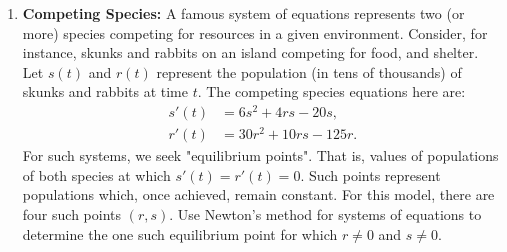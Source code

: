 \documentclass[12pt,twoside,openany]{memoir}
\begin{document}
\newpage
\phantom{a}
\newpage
\vspace{25pt}
\begin{enumerate}[label = \arabic*.]
    \addtocounter{enumi}{3}
    \item \textbf{Competing Species:} A famous system of equations represents two (or more) species
    competing for resources in a given environment. Consider, for instance, skunks and
    rabbits on an island competing for food, and shelter. Let $s(t)$ and $r(t)$ represent the
    population (in tens of thousands) of skunks and rabbits at time $t$. The competing
    species equations here are:
        \begin{equation*}
        \begin{split}
            s'(t) &= 6s^2 + 4rs - 20s, \\
            r'(t) &= 30r^2 + 10rs - 125r.
        \end{split}
        \end{equation*}
    For such systems, we seek "equilibrium points". That is, values of populations of both species at which $s'(t) = r'(t) = 0$. Such points represent populations which, once achieved, remain constant. For this model, there are four such points $(r,s)$. Use Newton's method for systems of equations to determine the one such equilibrium point for which $r \neq 0$ and $ s \neq 0$.
\end{enumerate}
    
\end{document}
